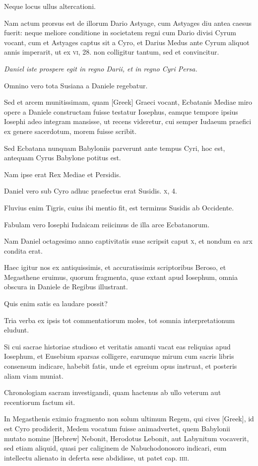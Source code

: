\begin{parnumbers}
Neque locus ullus altercationi.

Nam actum prorsus est de illorum Dario Astyage, cum Astyages diu antea
caesus fuerit: neque meliore conditione in societatem regni cum
Dario divisi Cyrum vocant, cum et Astyages captus sit a Cyro, et
Darius Medus ante Cyrum aliquot annis imperarit, ut ex \textsc{vi}, 28.
non colligitur tantum, sed et convincitur.

\textit{Daniel iste prospere egit in regno Darii, et in regno Cyri Persa.}

Omnino vero tota Susiana a Daniele regebatur.

Sed et arcem munitissimam, quam \textgreek{[Greek]}
Graeci vocant, Ecbatanis Mediae miro opere a Daniele constructam
fuisse testatur Iosephus, eamque tempore ipsius Iosephi adeo
integram mansisse, ut recens videretur, cui semper Iudaeum praefici
ex genere sacerdotum, morem fuisse scribit.

Sed Ecbatana nunquam
Babyloniis parverunt ante tempus Cyri, hoc est, antequam
Cyrus Babylone potitus est.

Nam ipse erat Rex Mediae et Persidis.

Daniel vero sub Cyro adhuc praefectus erat Susidis. \textsc{x}, 4.

Fluvius
enim Tigris, cuius ibi mentio fit, est terminus Susidis ab Occidente.

Fabulam vero Iosephi Iudaicam reiicimus de illa arce Ecbatanorum.

Nam Daniel octagesimo anno captivitatis suae scripsit caput
\textsc{x}, et nondum ea arx condita erat.

Haec igitur nos ex antiquissimis,
et accuratissimis scriptoribus Beroso, et Megasthene eruimus, quorum
fragmenta, quae extant apud Iosephum, omnia obscura in Daniele
de Regibus illustrant.

Quis enim satis ea laudare possit?

Tria verba ex ipsis tot commentatiorum moles, tot somnia interpretationum
eludunt.

Si cui sacrae historiae studioso et veritatis amanti
vacat eas reliquias apud Iosephum, et Eusebium sparsas colligere,
earumque mirum cum sacris libris consensum indicare, habebit
fatis, unde et egreium opus instruat, et posteris aliam viam
muniat.

Chronologiam sacram investigandi, quam hactenus
ab ullo veterum aut recentiorum factum sit.

In Megasthenis eximio fragmento non solum ultimum Regem, qui cives
 \textgreek{[Greek]}, id
est Cyro prodiderit, Medem vocatum fuisse animadvertet, quem
Babylonii mutato nomine \texthebrew{[Hebrew]} Nebonit, Herodotus Lebonit,
aut Labynitum vocaverit, sed etiam aliquid, quasi per caliginem
de Nabuchodonosoro indicari, eum intellectu alienato in deferta
sese abdidisse, ut patet cap. \textsc{iiii}.


\end{parnumbers}
